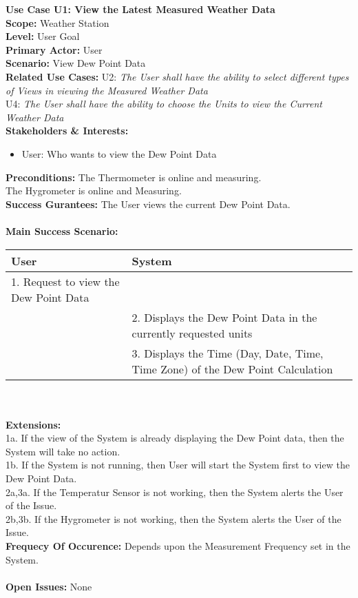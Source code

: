 \documentclass[letterpaper]{article}
\begin{document}
\noindent
\textbf{Use Case U1:  View the Latest Measured Weather Data}\\
\textbf{Scope:  }Weather Station\\
\textbf{Level:  }User Goal\\
\textbf{Primary Actor:  }User\\
\textbf{Scenario:  }View Dew Point Data\\
\textbf{Related Use Cases:  }U2: \textit{The User shall have the
ability to select different types of Views in viewing the Measured
Weather Data}\\ U4:  \textit{The User shall have the ability to
choose the Units to view the Current Weather Data}\\
\textbf{Stakeholders \& Interests:  }
\begin{itemize}
\item User:  Who wants to view the Dew Point Data
\end{itemize}
\textbf{Preconditions:  }The Thermometer is online and measuring.\\
The Hygrometer is online and Measuring.\\
\textbf{Success Gurantees:  }The User views the current Dew Point
Data.\\\\
\textbf{Main Success Scenario:  }\\
\begin{tabular}{|p{6cm}|p{6cm}|}\hline
\textbf{User} & \textbf{System}\\\hline
1.  Request to view the Dew Point Data & \\\hline
& 2.  Displays the Dew Point Data in the currently requested
units\\\hline
& 3.  Displays the Time (Day, Date, Time, Time Zone) of the
Dew Point Calculation\\\hline
\end{tabular}\\\\
\textbf{Extensions:  }\\
1a.  If the view of the System is already displaying the Dew Point
data, then the System will take no action.\\
1b.  If the System is not running, then User will start the System
first to view the Dew Point Data.\\
2a,3a.  If the Temperatur Sensor is not working, then the System
alerts the User of the Issue.\\
2b,3b.  If the Hygrometer is not working, then the System alerts the
User of the Issue.\\
\textbf{Frequecy Of Occurence: } Depends upon the Measurement
Frequency set in the System.\\\\
\textbf{Open Issues: } None
\end{document}
